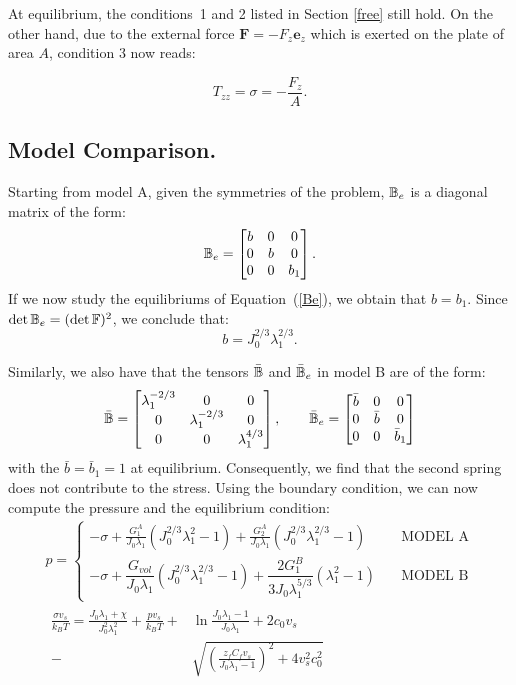 At equilibrium, the conditions~1 and 2 listed in Section \ref{free} still hold. On the other hand, due to the external force $\mathbf{F}= -F_z \mathbf{e}_z$ which is exerted on the plate of area $A$, condition 3 now reads:

\begin{equation}
T_{zz}=\sigma = -\frac{F_z}{A}.
\end{equation} 

\subsection{Model Comparison.}
Starting from model A, given the symmetries of the problem, $\mathbb{B}_e$ is a diagonal matrix of the form:
\begin{equation}
\mathbb{B}_e=\begin{bmatrix}
b &0&0\\
0&b&0\\
0&0& b_1
\end{bmatrix}. 
\end{equation}
If we now study the equilibriums of Equation~(\ref{Be}), we obtain that $b=b_1$. Since $\det \mathbb{B}_e= (\det \mathbb{F})^2$, we conclude that:
\begin{equation}
b = J_0^{2/3}\lambda_1^{2/3}.
\end{equation}

Similarly, we also have that the tensors $\bar{\mathbb{B}}$ and $\bar{\mathbb{B}}_e$ in model B are of the form:
\begin{equation}
\bar{\mathbb{B}}=\begin{bmatrix}
\lambda_1^{-2/3} &0&0\\
0&\lambda_1^{-2/3}&0\\
0&0& \lambda_1^{4/3}
\end{bmatrix}, \qquad
\bar{\mathbb{B}}_e=\begin{bmatrix}
\bar{b} &0&0\\
0&\bar{b}&0\\
0&0& \bar{b}_1
\end{bmatrix}
\end{equation}
with the $\bar{b}=\bar{b}_1=1$ at equilibrium. Consequently, we find that the second spring does not contribute to the stress. Using the boundary condition, we can now compute the pressure and the equilibrium condition:
\begin{gather}
p = \begin{cases}
\displaystyle
-\sigma + \frac{G^A_1}{J_0\lambda_1} (J^{2/3}_0\lambda_1^2-1)+\frac{G^A_2}{J_0\lambda_1} (J_0^{2/3} \lambda_1^{2/3}-1) &\quad \text{MODEL A} \\[10pt]
-\sigma + \dfrac{G_{vol}}{J_0\lambda_1}(J_0^{2/3}\lambda_1^{2/3}-1)+\dfrac{2G^B_1}{3J_0\lambda_1^{5/3}} (\lambda_1^2-1) &\quad \text{MODEL B}
\end{cases}\\[10pt]
\begin{aligned}
\frac{\sigma v_s}{k_B T}=\frac{J_0\lambda_1+\chi}{J_0^2\lambda^2_1}+\frac{pv_s}{k_B T}+&\ln \frac{J_0\lambda_1-1}{J_0\lambda_1} +2c_0v_s\\
-\ &\sqrt{\left(\frac{z_fC_fv_s}{J_0\lambda_1-1}\right)^2+4v_s^2c^2_0}
\end{aligned}\label{compA}
\end{gather}

